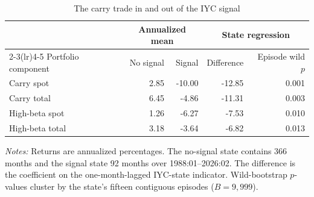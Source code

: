 \begin{table}[H]
\centering
\caption{The carry trade in and out of the IYC signal}\label{tab:inherited-headline}
\small
\begin{tabular}{lrrrr}
\toprule
 & \multicolumn{2}{c}{Annualized mean} & \multicolumn{2}{c}{State regression} \\
\cmidrule(lr){2-3}\cmidrule(lr){4-5}
Portfolio component & No signal & Signal & Difference & Episode wild $p$ \\
\midrule
Carry spot             &  2.85 & -10.00 & -12.85 & 0.001 \\
Carry total            &  6.45 &  -4.86 & -11.31 & 0.003 \\
High-beta spot         &  1.26 &  -6.27 &  -7.53 & 0.010 \\
High-beta total        &  3.18 &  -3.64 &  -6.82 & 0.013 \\
\bottomrule
\end{tabular}

\vspace{0.35em}
\begin{minipage}{0.94\textwidth}
\footnotesize\emph{Notes:} Returns are annualized percentages. The no-signal state contains 366 months and the signal state 92 months over 1988:01--2026:02. The difference is the coefficient on the one-month-lagged IYC-state indicator. Wild-bootstrap $p$-values cluster by the state's fifteen contiguous episodes ($B=9{,}999$).
\end{minipage}
\end{table}
